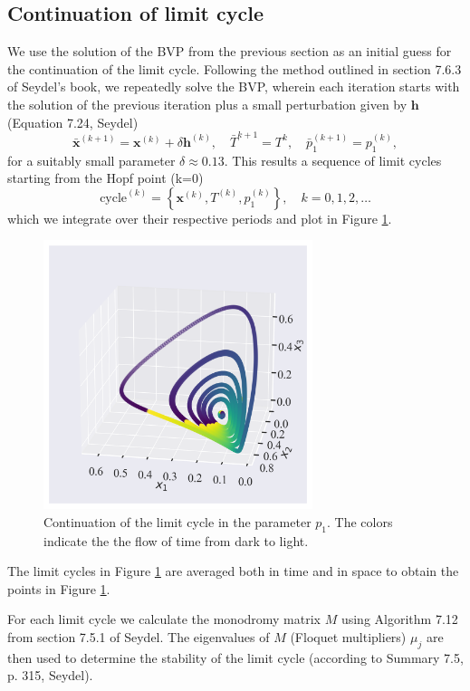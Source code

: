\subsection{Continuation of limit cycle}
We use the solution of the BVP from the previous section as an initial guess for the continuation of the limit cycle.
Following the method outlined in section 7.6.3 of Seydel's book, we repeatedly solve the BVP, wherein each 
iteration starts with the solution of the previous iteration plus a small perturbation given 
by $\mathbf{h}$ (Equation 7.24, Seydel)
\[
    \bar{\mathbf{x}}^{(k+1)} = \mathbf{x}^{(k)} + \delta \mathbf{h}^{(k)}, \quad \bar{T}^{k+1} = T^{k}, \quad \bar{p}_1^{(k+1)} = p_1^{(k)},
\]
for a suitably small parameter $\delta \approx 0.13$. This results a sequence of limit cycles starting from the Hopf point (k=0)
\[
    \textrm{cycle}^{(k)} = \left\{\mathbf{x}^{(k)}, T^{(k)}, p_1^{(k)} \right\}, \quad k = 0, 1, 2, \ldots
\]
which we integrate over their respective periods and plot in Figure \ref{fig:mcm_limit_cycle_continuation}.
\begin{figure}[H]
    \centering
    \includegraphics[width=0.7\textwidth]{figures/mcm_limit_cycles2.png}
    \caption{Continuation of the limit cycle in the parameter $p_1$. The colors indicate the the flow of time
    from dark to light.}
    \label{fig:mcm_limit_cycle_continuation}
\end{figure}
The limit cycles in Figure \ref{fig:mcm_limit_cycle_continuation} are averaged both in time and in space to obtain the points in 
Figure \ref{fig:mcm_limit_cycle_continuation}.

For each limit cycle we calculate the monodromy matrix $M$ using Algorithm 7.12
from section 7.5.1 of Seydel. The eigenvalues of $M$ (Floquet multipliers) $\mu_j$ are then used to determine the stability of the limit cycle
(according to Summary 7.5, p. 315, Seydel).

